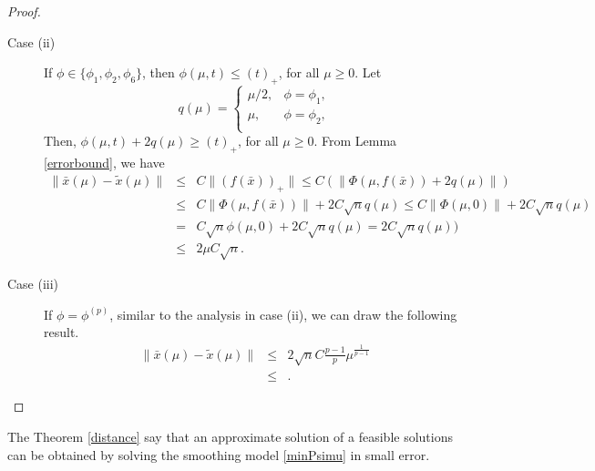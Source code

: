 \documentclass[12pt]{article}
\begin{document}
\begin{proof}
\begin{description}
    \item[Case (ii)] If $\phi \in \{\phi_1, \phi_2,\phi_6 \}$, then $\phi(\mu,t) 
                        \leq (t)_+$, for all $\mu \geq 0$.
                 Let
                 \begin{equation*}
                     q(\mu)=\left\{
                    \begin{array}{cc}
                            \mu/2, & \phi= \phi_1, \\
                            \mu, & \phi= \phi_2, \\
                    \end{array}
                    \right.
                 \end{equation*}
                Then,  $\phi(\mu,t) +  2q(\mu) \geq (t)_+$, for all $\mu \geq 0$.
                 From Lemma \ref{errorbound}, we have
                \begin{eqnarray*}
                        \| \bar{x}(\mu) - \tilde{x}(\mu)\| 
                        &\leq&  C\|(f( \bar{x}))_+\| \leq  C( \|\Phi(\mu,f( \bar{x})) +2q(\mu)\|)  \\
                        &\leq&  C\|\Phi(\mu,f( \bar{x}))\| + 2C\sqrt{n}q(\mu) 
                                \leq C\|\Phi(\mu,0)\| + 2C\sqrt{n}q(\mu)  \\
                        &=& C\sqrt{n}\phi(\mu,0) + 2C\sqrt{n}q(\mu) = 2C\sqrt{n}q(\mu))\\
                        &\leq& 2\mu C\sqrt{n}.
                        \end{eqnarray*}
     \item[Case (iii)] If $\phi =\phi^{(p)}$, similar to the analysis in case (ii), we can draw the following result.
                \begin{eqnarray*}
                    \| \bar{x}(\mu) - \tilde{x}(\mu)\|
                    &\leq&   2\sqrt{n}C\frac{p-1}{p}\mu^{\frac{1}{p-1}}\\
                    &\leq&  .
                \end{eqnarray*}
  \end{description}
\end{proof}

The Theorem \ref{distance} say that an approximate solution of a feasible 
solutions can be obtained by solving the smoothing model \eqref{minPsimu} in small error.
\end{document}
